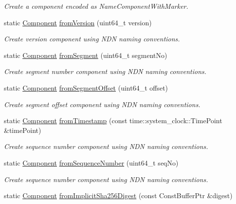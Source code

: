 \begin{DoxyCompactItemize}
\begin{DoxyCompactList}\small\item\em Create a component encoded as Name\+Component\+With\+Marker. \end{DoxyCompactList}\item 
static \hyperlink{classndn_1_1name_1_1Component}{Component} \hyperlink{classndn_1_1name_1_1Component_a6ae06c9e1c0865270a00f8b4e301e4a9}{from\+Version} (uint64\+\_\+t version)
\begin{DoxyCompactList}\small\item\em Create version component using N\+DN naming conventions. \end{DoxyCompactList}\item 
static \hyperlink{classndn_1_1name_1_1Component}{Component} \hyperlink{classndn_1_1name_1_1Component_a0469ffbfb32700a728fa003e9d39a9dc}{from\+Segment} (uint64\+\_\+t segment\+No)
\begin{DoxyCompactList}\small\item\em Create segment number component using N\+DN naming conventions. \end{DoxyCompactList}\item 
static \hyperlink{classndn_1_1name_1_1Component}{Component} \hyperlink{classndn_1_1name_1_1Component_a92e625d6fe3df170c626f766ab1dda2a}{from\+Segment\+Offset} (uint64\+\_\+t offset)
\begin{DoxyCompactList}\small\item\em Create segment offset component using N\+DN naming conventions. \end{DoxyCompactList}\item 
static \hyperlink{classndn_1_1name_1_1Component}{Component} \hyperlink{classndn_1_1name_1_1Component_ac2d60ae7f9ba6cf4003c6a880f2e613e}{from\+Timestamp} (const time\+::system\+\_\+clock\+::\+Time\+Point \&time\+Point)
\begin{DoxyCompactList}\small\item\em Create sequence number component using N\+DN naming conventions. \end{DoxyCompactList}\item 
static \hyperlink{classndn_1_1name_1_1Component}{Component} \hyperlink{classndn_1_1name_1_1Component_a6756d5d45ac8389f9ba1c2817c38c51a}{from\+Sequence\+Number} (uint64\+\_\+t seq\+No)
\begin{DoxyCompactList}\small\item\em Create sequence number component using N\+DN naming conventions. \end{DoxyCompactList}\item 
static \hyperlink{classndn_1_1name_1_1Component}{Component} \hyperlink{classndn_1_1name_1_1Component_a849d3336bd7a4cadd72b112d88673fbd}{from\+Implicit\+Sha256\+Digest} (const Const\+Buffer\+Ptr \&digest)\hypertarget{classndn_1_1name_1_1Component_a849d3336bd7a4cadd72b112d88673fbd}{}\label{classndn_1_1name_1_1Component_a849d3336bd7a4cadd72b112d88673fbd}


\end{DoxyCompactItemize}
